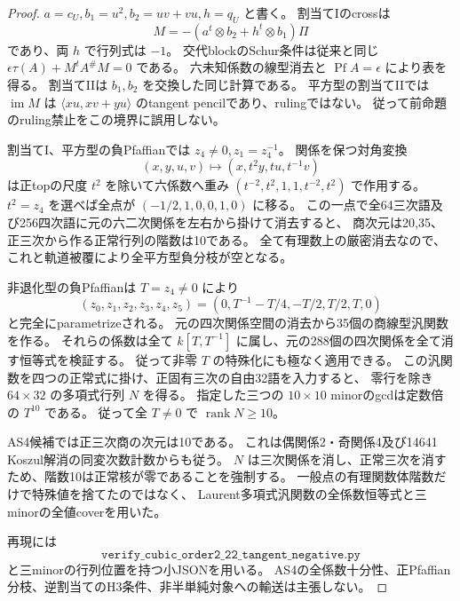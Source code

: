 \begin{proof}
$a=c_U,b_1=u^2,b_2=uv+vu,h=q_U$ と書く。
割当てIのcrossは
\[
 M=-(a^t\otimes b_2+h^t\otimes b_1)\Pi
\]
であり、両 $h$ で行列式は $-1$。
交代blockのSchur条件は従来と同じ
$\epsilon\tau(A)+M^tA^\#M=0$ である。
六未知係数の線型消去と $\operatorname{Pf}A=\epsilon$ により表を得る。
割当てIIは $b_1,b_2$ を交換した同じ計算である。
平方型の割当てIIでは $\operatorname{im}M$ は
$\langle xu,xv+yu\rangle$ のtangent pencilであり、rulingではない。
従って前命題のruling禁止をこの境界に誤用しない。

割当てI、平方型の負Pfaffianでは $z_4\ne0,z_1=z_4^{-1}$。
関係を保つ対角変換
\[
 (x,y,u,v)\longmapsto(x,t^2y,tu,t^{-1}v)
\]
は正topの尺度 $t^2$ を除いて六係数へ重み
$(t^{-2},t^2,1,1,t^{-2},t^2)$ で作用する。
$t^2=z_4$ を選べば全点が $(-1/2,1,0,0,1,0)$ に移る。
この一点で全64三次語及び256四次語に元の六二次関係を左右から掛けて消去すると、
商次元は20,35、正三次から作る正常行列の階数は10である。
全て有理数上の厳密消去なので、これと軌道被覆により全平方型負分枝が空となる。

非退化型の負Pfaffianは $T=z_4\ne0$ により
\[
 (z_0,z_1,z_2,z_3,z_4,z_5)
 =(0,T^{-1}-T/4,-T/2,T/2,T,0)
\]
と完全にparametrizeされる。
元の四次関係空間の消去から35個の商線型汎関数を作る。
それらの係数は全て $k[T,T^{-1}]$ に属し、元の288個の四次関係を全て消す恒等式を検証する。
従って非零 $T$ の特殊化にも極なく適用できる。
この汎関数を四つの正常式に掛け、正固有三次の自由32語を入力すると、
零行を除き $64\times32$ の多項式行列 $N$ を得る。
指定した三つの $10\times10$ minorのgcdは定数倍の $T^{10}$ である。
従って全 $T\ne0$ で $\operatorname{rank}N\ge10$。

AS4候補では正三次商の次元は10である。
これは偶関係2・奇関係4及び14641 Koszul解消の同変次数計数からも従う。
$N$ は三次関係を消し、正常三次を消すため、階数10は正常核が零であることを強制する。
一般点の有理関数体階数だけで特殊値を捨てたのではなく、
Laurent多項式汎関数の全係数恒等式と三minorの全値coverを用いた。

再現には
\[
\texttt{verify\_cubic\_order2\_22\_tangent\_negative.py}
\]
と三minorの行列位置を持つ小JSONを用いる。
AS4の全係数十分性、正Pfaffian分枝、逆割当てのH3条件、非半単純対象への輸送は主張しない。
\end{proof}
